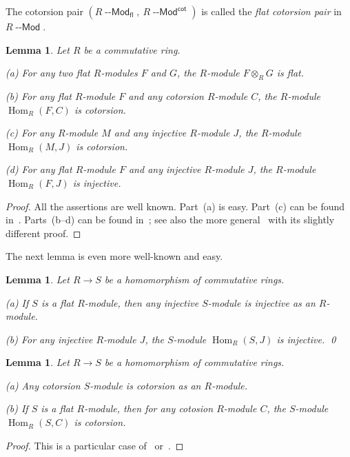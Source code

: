 \documentclass[12pt,a4paper]{amsart}
\newcommand{\+}{\nobreakdash-}
\renewcommand{\:}{\colon}
\newcommand{\rarrow}{\longrightarrow}
\newcommand{\ot}{\otimes}
\DeclareMathOperator{\Hom}{Hom}
\newcommand{\Modl}{{\operatorname{\mathsf{--Mod}}}}
\newcommand{\fl}{\mathsf{fl}}
\renewcommand{\cot}{\mathsf{cot}}
\theoremstyle{plain}
\newtheorem{lem}[thm]{Lemma}
\theoremstyle{definition}
\begin{document}
 The cotorsion pair $(R\Modl_\fl,\allowbreak\>R\Modl^\cot)$ is called
the \emph{flat cotorsion pair} in $R\Modl$.

\begin{lem} \label{flat-cotorsion-injective-tensor-Hom-lemma}
 Let $R$ be a commutative ring. \par
\textup{(a)} For any two flat $R$\+modules $F$ and $G$,
the $R$\+module $F\ot_RG$ is flat. \par
\textup{(b)} For any flat $R$\+module $F$ and any cotorsion
$R$\+module $C$, the $R$\+module\/ $\Hom_R(F,C)$ is cotorsion. \par
\textup{(c)} For any $R$\+module $M$ and any injective
$R$\+module $J$, the $R$\+module\/ $\Hom_R(M,J)$ is cotorsion. \par
\textup{(d)} For any flat $R$\+module $F$ and any injective
$R$\+module $J$, the $R$\+module\/ $\Hom_R(F,J)$ is injective.
\end{lem}

\begin{proof}
 All the assertions are well known.
 Part~(a) is easy.
 Part~(c) can be found in~\cite[Lemma~2.1]{En2}.
 Parts~(b\+-d) can be found in~\cite[Lemma~1.3.2]{Pcosh};
see also the more general~\cite[Lemma~1.5]{Pdomc} with its
slightly different proof.
\end{proof}

 The next lemma is even more well-known and easy.

\begin{lem} \label{injective-change-of-scalars-lemma}
 Let $R\rarrow S$ be a homomorphism of commutative rings. \par
\textup{(a)} If $S$ is a flat $R$\+module, then any injective
$S$\+module is injective as an $R$\+module. \par
\textup{(b)} For any injective $R$\+module $J$, the $S$\+module\/
$\Hom_R(S,J)$ is injective. \qed
\end{lem}

\begin{lem} \label{cotorsion-change-of-scalars-lemma}
 Let $R\rarrow S$ be a homomorphism of commutative rings. \par
\textup{(a)} Any cotorsion $S$\+module is cotorsion as an $R$\+module.
\par
\textup{(b)} If $S$ is a flat $R$\+module, then for any cotosion
$R$\+module $C$, the $S$\+module\/ $\Hom_R(S,C)$ is cotorsion.
\end{lem}

\begin{proof}
 This is a particular case of~\cite[Lemmas~1.3.4(a) and~1.3.5(a)]{Pcosh}
or~\cite[Lemma~1.6(a,c)]{Pdomc}.
\end{proof}
\end{document}
